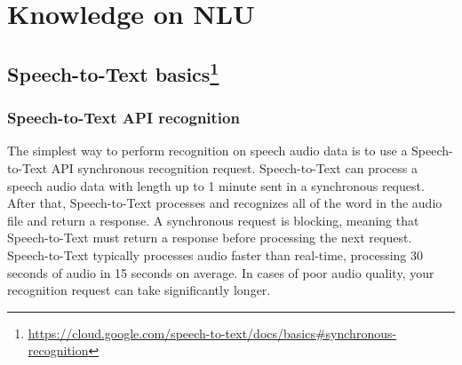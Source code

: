 \newpage    
    
\section{Knowledge on NLU}
\subsection[title]{Speech-to-Text basics\footnote{\url{https://cloud.google.com/speech-to-text/docs/basics#synchronous-recognition}}}
\subsubsection{Speech-to-Text API recognition} 
The simplest way to perform recognition on speech audio data is to use a Speech-to-Text API synchronous recognition request. Speech-to-Text can process a speech audio data with length up to 1 minute sent in a synchronous request. After that, Speech-to-Text processes and recognizes all of the word in the audio file and return a response.
\newline
\indent A synchronous request is blocking, meaning that Speech-to-Text must return a response before processing the next request. Speech-to-Text typically processes audio faster than real-time, processing 30 seconds of audio in 15 seconds on average. In cases of poor audio quality, your recognition request can take significantly longer.
